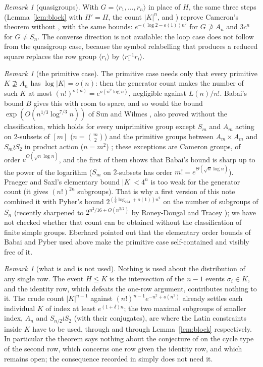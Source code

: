 \documentclass[11pt]{amsart}
\theoremstyle{plain}
\theoremstyle{remark}
\newtheorem{remark}[theorem]{Remark}
\begin{document}
\begin{remark}[quasigroups]
With $G=\langle r_1,\dots,r_n\rangle$ in place of $H$, the same three
steps (Lemma~\ref{lem:block} with $\Pi'=\Pi$, the count $|K|^n$, and
\cite{HJ96}) reprove Cameron's theorem \cite{Cam92} without
\cite{LP93}, with the same bounds: $e^{-(\log2-o(1))n^2}$ for
$G\not\supseteq A_n$ and $3c^n$ for $G\ne S_n$.  The converse direction is not
available: the loop case does not follow from the quasigroup case,
because the symbol relabelling that produces a reduced square replaces
the row group $\langle r_i\rangle$ by $\langle r_1^{-1}r_i\rangle$.
\end{remark}

\begin{remark}[the primitive case]\label{rem:primitive}
The primitive case needs only that every primitive $K\not\supseteq A_n$
has $\log|K|=o(n)$: then the generator count makes the number of such
$K$ at most $(n!)^{o(n)}=e^{o(n^2\log n)}$, negligible against
$L(n)/n!$.  Babai's bound $B$ gives this with room to spare, and so
would the bound $\exp(O(n^{1/3}\log^{7/3}n))$ of Sun and Wilmes
\cite{SW15}, also proved without the classification, which holds for
every uniprimitive group except $S_m$ and $A_m$ acting on $2$-subsets
of $[m]$ ($n=\binom m2$) and the primitive groups between $A_m\times A_m$
and $S_m\wr S_2$ in product action ($n=m^2$) \cite[Corollary~1.3]{SW15};
these exceptions are Cameron groups, of order $e^{O(\sqrt n\log n)}$,
and the first of them shows that Babai's bound is sharp up to the power
of the logarithm ($S_m$ on $2$-subsets has order $m!=e^{\Theta(\sqrt n\log n)}$).
Praeger and Saxl's elementary bound $|K|<4^n$ \cite{PS80} is too weak
for the generator count (it gives $(n!)^{2n}$ subgroups).  That is why
a first version of this note combined it with Pyber's bound
$2^{(\frac16\log_224+o(1))n^2}$ on the number of subgroups of $S_n$
\cite{Pyb93} (recently sharpened to $2^{n^2/16+O(n^{3/2})}$ by
Roney-Dougal and Tracey \cite{RT25}); we have not checked whether that
count can be obtained without the classification of finite simple
groups.  Eberhard pointed out that the elementary order bounds of
Babai and Pyber used above make the primitive case self-contained and
visibly free of it.
\end{remark}

\begin{remark}[what is and is not used]
Nothing is used about the distribution of any single row.  The event
$H\le K$ is the intersection of the $n-1$ events $\sigma_i\in K$, and the
identity row, which defeats the one-row argument, contributes nothing
to it.  The crude count $|K|^{n-1}$ against $(n!)^{n-1}e^{-n^2+o(n^2)}$
already settles each individual $K$ of index at least
$e^{(1+\delta)n}$; the two maximal subgroups of smaller index, $A_n$
and $S_{n/2}\wr S_2$ (with their conjugates), are where the Latin
constraints inside $K$ have to be used, through \cite{HJ96} and
through Lemma~\ref{lem:block} respectively.  In particular the theorem
says nothing about the conjecture of \cite{CGW08} on the cycle type of
the second row, which concerns one row given the identity row, and
which remains open; the consequence recorded in \cite[Lemma~6.2]{CGW08}
simply does not need it.
\end{remark}
\end{document}
